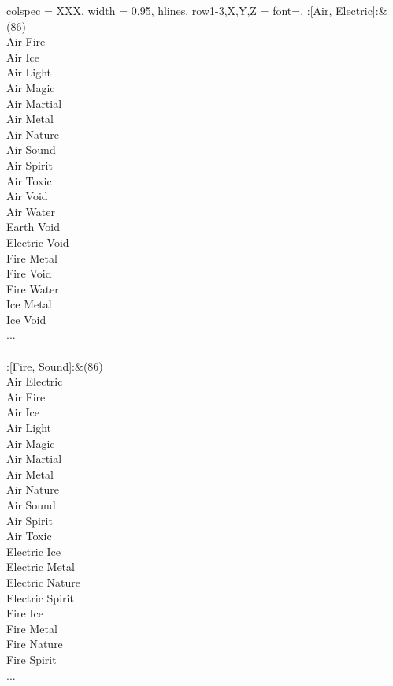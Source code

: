 \begin{longtblr}[
	caption = {2v2 Attacking Effective},
	label = {2v2-Attacking-Effective},
]{
	colspec = {XXX}, width = 0.95\linewidth,
	hlines,
	row{1-3,X,Y,Z} = {font=\bfseries},
}
	:[Air, Electric]:&{(86)\\
	Air Fire \\
	Air Ice \\
	Air Light \\
	Air Magic \\
	Air Martial \\
	Air Metal \\
	Air Nature \\
	Air Sound \\
	Air Spirit \\
	Air Toxic \\
	Air Void \\
	Air Water \\
	Earth Void \\
	Electric Void \\
	Fire Metal \\
	Fire Void \\
	Fire Water \\
	Ice Metal \\
	Ice Void \\
	...\\
	}\\

	:[Fire, Sound]:&{(86)\\
	Air Electric \\
	Air Fire \\
	Air Ice \\
	Air Light \\
	Air Magic \\
	Air Martial \\
	Air Metal \\
	Air Nature \\
	Air Sound \\
	Air Spirit \\
	Air Toxic \\
	Electric Ice \\
	Electric Metal \\
	Electric Nature \\
	Electric Spirit \\
	Fire Ice \\
	Fire Metal \\
	Fire Nature \\
	Fire Spirit \\
	...\\
	}\\


\end{longtblr}
